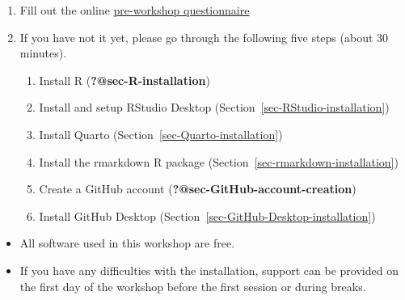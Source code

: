 \documentclass[
  letterpaper,
  DIV=11,
  numbers=noendperiod]{scrreprt}
\providecommand{\tightlist}{%
  \setlength{\itemsep}{0pt}\setlength{\parskip}{0pt}}\usepackage{longtable,booktabs,array}
\begin{document}
\begin{enumerate}
\def\labelenumi{\arabic{enumi}.}
\item
  Fill out the online
  \href{https://timicodktest.smartforest.de/-/single/cac06e76b3e163e655e49626f8129de8f55a8035ced54f15bc4c6cf527dba8a7?st=DnBRz677PIYh33ML0rE1amWzyhCIYPGFQnmZ6AAou8nJFyikWN6nLM5i3G4I0YZN}{pre-workshop
  questionnaire}
\item
  If you have not it yet, please go through the following five steps
  (about 30 minutes).

  \begin{enumerate}
  \def\labelenumii{\alph{enumii}.}
  \item
    Install R (\textbf{?@sec-R-installation})
  \item
    Install and setup RStudio Desktop
    (Section~\ref{sec-RStudio-installation})
  \item
    Install Quarto (Section~\ref{sec-Quarto-installation})
  \item
    Install the rmarkdown R package
    (Section~\ref{sec-rmarkdown-installation})
  \item
    Create a GitHub account (\textbf{?@sec-GitHub-account-creation})
  \item
    Install GitHub Desktop
    (Section~\ref{sec-GitHub-Desktop-installation})
  \end{enumerate}
\end{enumerate}

\begin{tcolorbox}[enhanced jigsaw, bottomtitle=1mm, title=\textcolor{quarto-callout-note-color}{\faInfo}\hspace{0.5em}{Note}, toptitle=1mm, toprule=.15mm, breakable, colframe=quarto-callout-note-color-frame, coltitle=black, rightrule=.15mm, arc=.35mm, left=2mm, opacitybacktitle=0.6, colback=white, colbacktitle=quarto-callout-note-color!10!white, bottomrule=.15mm, opacityback=0, titlerule=0mm, leftrule=.75mm]

\begin{itemize}
\tightlist
\item
  All software used in this workshop are free.
\item
  If you have any difficulties with the installation, support can be
  provided on the first day of the workshop before the first session or
  during breaks.
\end{itemize}

\end{tcolorbox}
\end{document}

